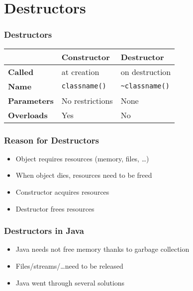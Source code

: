 \section{Destructors}
\frame{\tableofcontents[currentsection]}

\begin{frame}
  \frametitle{Destructors}
  \begin{center}
    \begin{tabular}{lll}
      & \textbf{Constructor} & \textbf{Destructor} \\
      \toprule
      \textbf{Called} & at creation & on destruction \\
      \textbf{Name} & {\tt classname()} & {\tt \~{}classname()} \\
      \textbf{Parameters} & No restrictions & None \\
      \textbf{Overloads} & Yes & No \\
    \end{tabular}
  \end{center}
  \vskip5mm
\end{frame}

\begin{frame}
  \frametitle{Reason for Destructors}
  \begin{itemize}
    \item Object requires resources (memory, files, \dots)
    \item When object dies, resources need to be freed
    \item Constructor acquires resources
    \item Destructor frees resources
  \end{itemize}
\end{frame}

\begin{frame}
  \frametitle{Destructors in Java}
  \begin{itemize}
    \item Java needs not free memory thanks to garbage collection
    \item Files/streams/\dots need to be released
    \item Java went through several solutions
  \end{itemize}
\end{frame}

